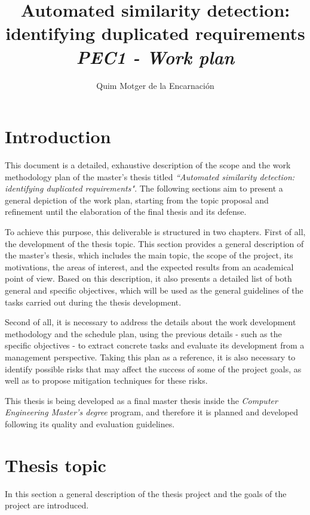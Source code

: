 \documentclass[a4paper]{article}
\title{Automated similarity detection:\\ identifying duplicated requirements\\\textit{PEC1 - Work plan}}
\author{
%
Quim Motger de la Encarnación
\institution{Universitat Oberta de Catalunya\\Universitat Politecnica de Catalunya}
}
\begin{document}
\maketitle

\section{Introduction}
\label{sec:introduction}

This document is a detailed, exhaustive description of the scope and the work methodology plan of the master's thesis titled \textit{``Automated similarity detection: identifying duplicated requirements"}. The following sections aim to present a general depiction of the work plan, starting from the topic proposal and refinement until the elaboration of the final thesis and its defense.

To achieve this purpose, this deliverable is structured in two chapters. First of all, the development of the thesis topic. This section provides a general description of the master's thesis, which includes the main topic, the scope of the project, its motivations, the areas of interest, and the expected results from an academical point of view. Based on this description, it also presents a detailed list of both general and specific objectives, which will be used as the general guidelines of the tasks carried out during the thesis development.

Second of all, it is necessary to address the details about the work development methodology and the schedule plan, using the previous details - such as the specific objectives - to extract concrete tasks and evaluate its development from a management perspective. Taking this plan as a reference, it is also necessary to identify possible risks that may affect the success of some of the project goals, as well as to propose mitigation techniques for these risks.

This thesis is being developed as a final master thesis inside the \textit{Computer Engineering Master's degree} program, and therefore it is planned and developed following its quality and evaluation guidelines.

\section{Thesis topic}
\label{sec:topic_description}

In this section a general description of the thesis project and the goals of the project are introduced.
\end{document}
